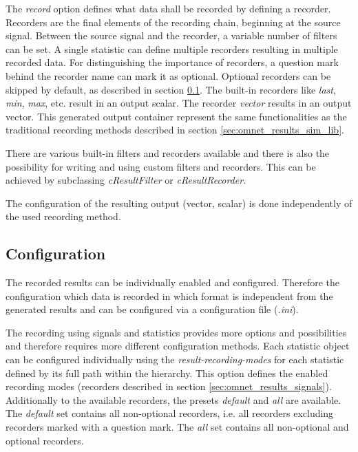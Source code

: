 The \emph{record} option defines what data shall be recorded by defining a recorder.
Recorders are the final elements of the recording chain, beginning at the source signal.
Between the source signal and the recorder, a variable number of filters can be set.
A single statistic can define multiple recorders resulting in multiple recorded data.
For distinguishing the importance of recorders, a question mark behind the recorder name can mark it as optional.
Optional recorders can be skipped by default, as described in section \ref{sec:omnet_results_config}.
The built-in recorders like \emph{last}, \emph{min}, \emph{max}, etc. result in an output scalar.
The recorder \emph{vector} results in an output vector.
This generated output container represent the same functionalities as the traditional recording methods described in section \ref{sec:omnet_results_sim_lib}.

There are various built-in filters and recorders available \cite[section 4.15.2]{omnet_manual} and there is also the possibility for writing and using custom filters and recorders. 
This can be achieved by subclassing \emph{cResultFilter} or \emph{cResultRecorder}. \cite[section 4.15.6]{omnet_manual}

The configuration of the resulting output (vector, scalar) is done independently of the used recording method.

\subsection{Configuration}
\label{sec:omnet_results_config}
The recorded results can be individually enabled and configured.
Therefore the configuration which data is recorded in which format is independent from the generated results and can be configured via a configuration file (\emph{.ini}).

The recording using signals and statistics provides more options and possibilities and therefore requires more different configuration methods.
Each statistic object can be configured individually using the \emph{result-recording-modes} for each statistic defined by its full path within the hierarchy.
This option defines the enabled recording modes (recorders described in section \ref{sec:omnet_results_signals}).
Additionally to the available recorders, the presets \emph{default} and \emph{all} are available.
The \emph{default} set contains all non-optional recorders, i.e. all recorders excluding recorders marked with a question mark.
The \emph{all} set contains all non-optional and optional recorders. \cite[section 12.2.1]{omnet_manual}

